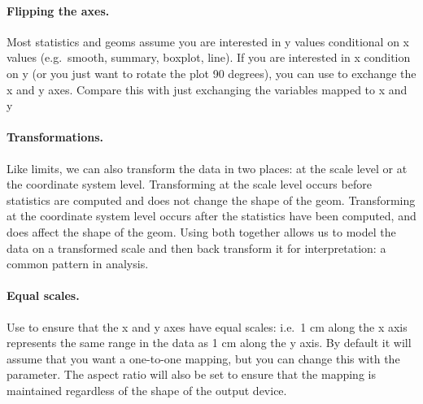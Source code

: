 \paragraph{Flipping the axes.}  Most statistics and geoms assume you are interested in y values conditional on x values (e.g.\ smooth, summary, boxplot, line).  If you are interested in x condition on y (or you just want to rotate the plot 90 degrees), you can use  to exchange the x and y axes.  Compare this with just exchanging the variables mapped to x and y

% 

\paragraph{Transformations.}  Like limits, we can also transform the data in two places: at the scale level or at the coordinate system level.  Transforming at the scale level occurs before statistics are computed and does not change the shape of the geom.  Transforming at the coordinate system level occurs after the statistics have been computed, and does affect the shape of the geom.  Using both together allows us to model the data on a transformed scale and then back transform it for interpretation: a common pattern in analysis.

% 


\paragraph{Equal scales.}  Use  to ensure that the x and y axes have equal scales: i.e.\ 1 cm along the x axis represents the same range in the data as 1 cm along the y axis.  By default it will assume that you want a one-to-one mapping, but you can change this with the  parameter.  The aspect ratio will also be set to ensure that the mapping is maintained regardless of the shape of the output device.

